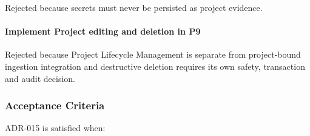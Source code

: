 Rejected because secrets must never be persisted as project evidence.

\hypertarget{implement-project-editing-and-deletion-in-p9}{%
\paragraph{Implement Project editing and deletion in P9}\label{implement-project-editing-and-deletion-in-p9}}

Rejected because Project Lifecycle Management is separate from project-bound ingestion integration and destructive deletion requires its own safety, transaction and audit decision.

\hypertarget{acceptance-criteria}{%
\subsubsection{Acceptance Criteria}\label{acceptance-criteria}}

ADR-015 is satisfied when:

